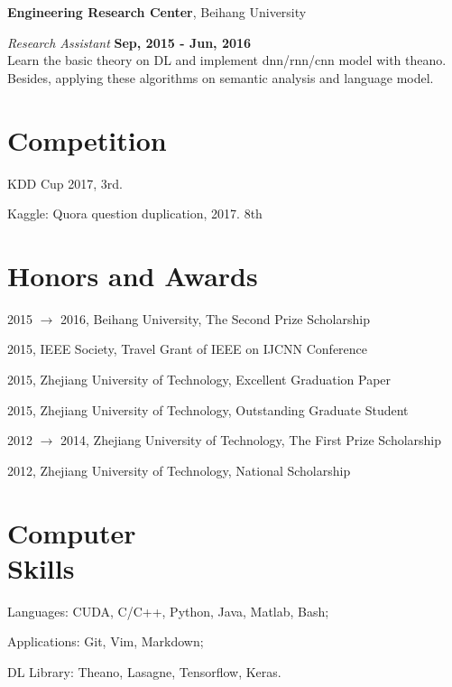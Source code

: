 \documentclass[margin,line]{resume}
\begin{document}
\begin{resume}
{\bf Engineering Research Center}, Beihang University

{\em Research Assistant} \hfill {\bf Sep, 2015 - Jun, 2016}\\
Learn the basic theory on DL and implement dnn/rnn/cnn model with theano. Besides, applying these algorithms on semantic analysis and language model.



\section{Competition}
KDD Cup 2017, 3rd.

Kaggle: Quora question duplication, 2017. 8th

\section{Honors and Awards}


2015 $\to$ 2016, Beihang University, The Second Prize Scholarship

2015, IEEE Society, Travel Grant of IEEE on IJCNN Conference

2015, Zhejiang University of Technology, Excellent Graduation Paper

2015, Zhejiang University of Technology, Outstanding Graduate Student

2012 $\to$ 2014, Zhejiang University of Technology, The First Prize Scholarship

2012, Zhejiang University of Technology, National Scholarship




\section{Computer \\ Skills}
Languages: CUDA, C/C++, Python, Java, Matlab, Bash;

Applications: Git, Vim, Markdown;

DL Library: Theano, Lasagne, Tensorflow, Keras.\\

\end{resume}
\end{document}
